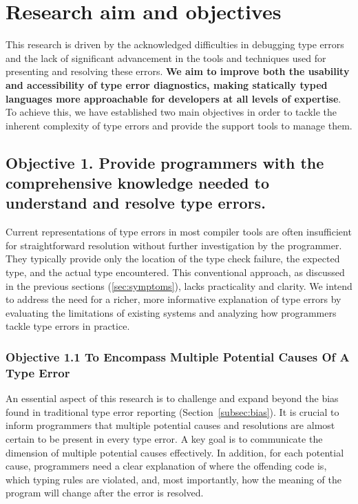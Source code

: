 \section{Research aim and objectives}

This research is driven by the acknowledged difficulties in debugging type errors and the lack of significant advancement in the tools and techniques used for presenting and resolving these errors. \textbf{We aim to improve both the usability and accessibility of type error diagnostics, making statically typed languages more approachable for developers at all levels of expertise}. To achieve this, we have established two main objectives in order to tackle the inherent complexity of type errors and provide the support tools to manage them.

\subsection*{Objective 1. Provide programmers with the comprehensive knowledge needed to understand and resolve type errors.}
\label{subsec:aim1}

Current representations of type errors in most compiler tools are often insufficient for straightforward resolution without further investigation by the programmer. They typically provide only the location of the type check failure, the expected type, and the actual type encountered. This conventional approach, as discussed in the previous sections (\ref{sec:symptoms}), lacks practicality and clarity. We intend to address the need for a richer, more informative explanation of type errors by evaluating the limitations of existing systems and analyzing how programmers tackle type errors in practice.

\subsubsection*{Objective 1.1 To Encompass Multiple Potential Causes Of A Type Error}
An essential aspect of this research is to challenge and expand beyond the bias found in traditional type error reporting (Section~\ref{subsec:bias}). It is crucial to inform programmers that multiple potential causes and resolutions are almost certain to be present in every type error. A key goal is to communicate the dimension of multiple potential causes effectively. In addition, for each potential cause, programmers need a clear explanation of where the offending code is, which typing rules are violated, and, most importantly, how the meaning of the program will change after the error is resolved.


